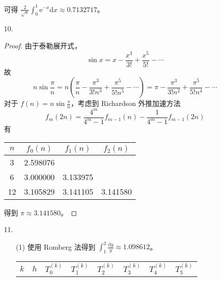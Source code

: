 \documentclass{sjtuarticle}
\def\dd{\mathrm{d}}
\def\ee{\mathrm{e}}
\begin{document}
\begin{itemize}
\begin{solution}
\begin{center}
\begin{tabular}{cccccc}
            \bottomrule
        \end{tabular}
        \end{center}
        可得 $\frac{2}{\sqrt{\pi}}\int_0^1 \ee^{-x}\dd x\approx 0.7132717$。
    \end{solution}
    \item[10.] \begin{proof}
        由于泰勒展开式，
        \begin{equation*}
            \sin x=x-\frac{x^3}{3!}+\frac{x^5}{5!}-\cdots
        \end{equation*}
        故
        \begin{equation*}
            n\sin\frac{\pi}{n}=n(\frac{\pi}{n}-\frac{\pi^3}{3!n^3}+\frac{\pi^5}{5!n^5}-\cdots)=\pi-\frac{\pi^3}{3!n^2}+\frac{\pi^5}{5!n^4}-\cdots
        \end{equation*}
        对于 $f(n)=n\sin\frac{\pi}{n}$，考虑到 Richardson 外推加速方法
        \begin{equation*}
            f_m(2n)=\frac{4^m}{4^m-1}f_{m-1}(n)-\frac{1}{4^m-1}f_{m-1}(2n)
        \end{equation*}
        有
        \begin{center}
            \begin{tabular}{cccc}
                \toprule
                $n$ & $f_0(n)$ & $f_1(n)$ & $f_2(n)$ \\
                \midrule
                3  &  2.598076  \\
                6  &  3.000000   &  3.133975  \\
                12  &  3.105829    &    3.141105    &    3.141580   \\
                \bottomrule
            \end{tabular}
        \end{center}
        得到 $\pi\approx 3.141580$。
    \end{proof}
    \item[11.] \begin{solution}
        \begin{itemize}
            \item[(1)] 使用 Romberg 法得到 $\int_1^3 \frac{\dd y}{y}\approx 1.098612$。
            \begin{center}
            \begin{tabular}{cccccccc}
            \toprule
            $k$ & $h$ & $T_0^{(k)}$ & $T_1^{(k)}$ & $T_2^{(k)}$ &  $T_3^{(k)}$ & $T_4^{(k)}$ & $T_5^{(k)}$ \\

\end{tabular}
\end{center}
\end{itemize}
\end{solution}
\end{itemize}
\end{document}
